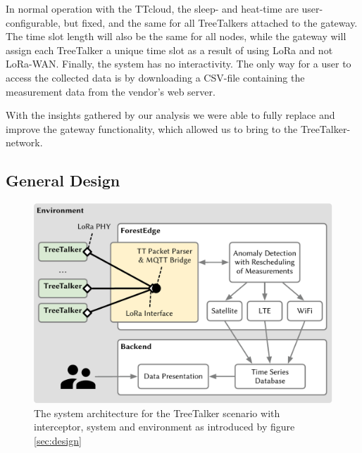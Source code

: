 In normal operation with the TTcloud, the sleep- and heat-time are user-configurable, but fixed, and the same for all TreeTalkers attached to the gateway.
The time slot length will also be the same for all nodes, while the gateway will assign each TreeTalker a unique time slot as a result of using LoRa and not LoRa-WAN.
Finally, the system has no interactivity.
The only way for a user to access the collected data is by downloading a CSV-file containing the measurement data from the vendor's web server.

With the insights gathered by our analysis we were able to fully replace and improve the gateway functionality, which allowed us to bring \mm to the TreeTalker-network.




\subsection{General Design}
\label{sec:TreeTalker:design}

\begin{figure}
    \centering
    \includegraphics[width=\linewidth]{figures/MechanismInterceptionTTT.pdf}
    \caption{The system architecture for the TreeTalker scenario with interceptor, system and environment as introduced by figure \ref{sec:design}}
    \label{fig:MechanismInterceptionTTT}
\end{figure}

